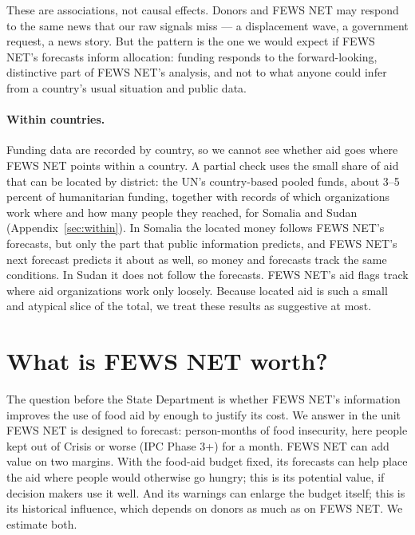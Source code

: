 \documentclass[11pt]{article}
\begin{document}
These are associations, not causal effects. Donors and FEWS NET may respond to the same news that our raw signals miss --- a displacement wave, a government request, a news story. But the pattern is the one we would expect if FEWS NET's forecasts inform allocation: funding responds to the forward-looking, distinctive part of FEWS NET's analysis, and not to what anyone could infer from a country's usual situation and public data.

\paragraph{Within countries.} Funding data are recorded by country, so we cannot see whether aid goes where FEWS NET points within a country. A partial check uses the small share of aid that can be located by district: the UN's country-based pooled funds, about 3--5 percent of humanitarian funding, together with records of which organizations work where and how many people they reached, for Somalia and Sudan (Appendix~\ref{sec:within}). In Somalia the located money follows FEWS NET's forecasts, but only the part that public information predicts, and FEWS NET's next forecast predicts it about as well, so money and forecasts track the same conditions. In Sudan it does not follow the forecasts. FEWS NET's aid flags track where aid organizations work only loosely. Because located aid is such a small and atypical slice of the total, we treat these results as suggestive at most.

\FloatBarrier
\section{What is FEWS NET worth?}\label{sec:bcr}

The question before the State Department is whether FEWS NET's information improves the use of food aid by enough to justify its cost. We answer in the unit FEWS NET is designed to forecast: person-months of food insecurity, here people kept out of Crisis or worse (IPC Phase 3+) for a month. FEWS NET can add value on two margins. With the food-aid budget fixed, its forecasts can help place the aid where people would otherwise go hungry; this is its potential value, if decision makers use it well. And its warnings can enlarge the budget itself; this is its historical influence, which depends on donors as much as on FEWS NET. We estimate both.
\end{document}
